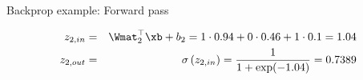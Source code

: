 \begin{vbframe}{Backprop example: Forward pass}
  \begin{figure}
    \centering
  \end{figure}

\vspace*{-0.5cm}

  \begin{footnotesize}
    \begin{eqnarray*}
    z_{2,in} &=& \Wmat_2^\top \xb + b_2 = 1 \cdot 0.94 + 0 \cdot 0.46 + 1 \cdot 0.1 = 1.04 \\
    z_{2,out} &=& \sigma\left(z_{2,in}\right) = \frac{1}{1+\exp(-1.04)} = \num[round-mode=places,round-precision=4]{0.73885}
    \end{eqnarray*}
  \end{footnotesize}


\end{vbframe}
